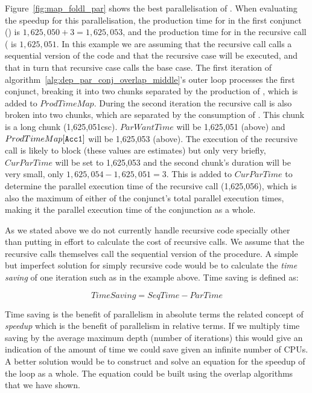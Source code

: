 Figure~\ref{fig:map_foldl_par} shows the best parallelisation of
\mapfoldl.
When evaluating the speedup for this parallelisation,
the production time for  in the first conjunct
()
is 
$1,625,050 + 3 = 1,625,053$, and
the production time for  in the recursive call (
is $1,625,051$.
In this example we are assuming that the recursive call calls a sequential
version of the code and that the recursive case will be executed,
and that in turn that recursive case calls the base case.
The first iteration of
algorithm~\ref{alg:dep_par_conj_overlap_middle}'s outer loop processes the
first conjunct,
breaking it into two chunks separated by the production of ,
which is added to $ProdTimeMap$.
During the second iteration the recursive call is also broken into two
chunks, which are separated by the consumption of .
This chunk is a long chunk (1,625,051csc).
$ParWantTime$ will be 1,625,051 (above) and $ProdTimeMap[\text{{\tt Acc1}}]$
will be 1,625,053 (above).
The execution of the recursive call is likely to block
(these values are estimates) but only very briefly,
$CurParTime$ will be set to 1,625,053 and the second chunk's duration will
be very small, only $1,625,054 - 1,625,051 = 3$.
This is added to $CurParTime$ to determine the parallel execution time of
the recursive call (1,625,056),
which is also the maximum of either of the conjunct's total parallel
execution times,
making it the parallel execution time of the conjunction as a whole.

As we stated above we do not currently handle recursive code specially other
than putting in effort to calculate the cost of recursive calls.
We assume that the recursive calls themselves call the sequential version of
the procedure.
A simple but imperfect solution for simply recursive code would be to
calculate the \emph{time saving} of one iteration such as in the example
above.
Time saving is defined as:

\begin{equation*}
TimeSaving = SeqTime - ParTime
\end{equation*}

\noindent
Time saving is the benefit of parallelism in absolute terms
the related concept of \emph{speedup} which is the benefit of parallelism in
relative terms.
If we multiply time saving by the average maximum depth (number of
iterations) this would give an indication of the amount of time we could
save given an infinite number of CPUs.
A better solution would be to construct and solve an equation for the
speedup of the loop as a whole.
The equation could be built using the overlap algorithms that we have shown.

